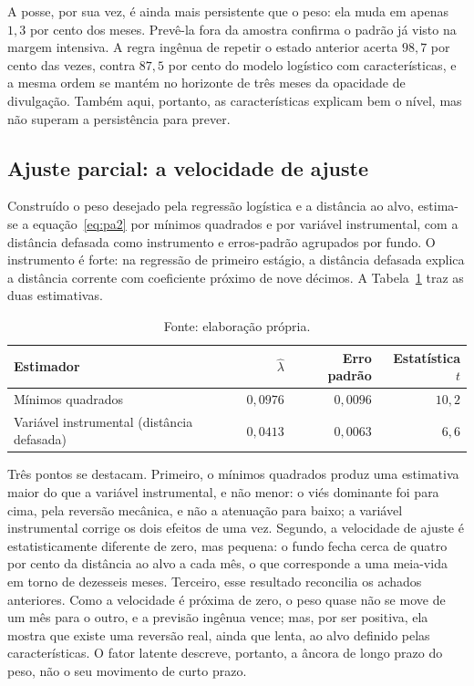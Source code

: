 \documentclass[12pt,a4paper]{article}
\begin{document}
A posse, por sua vez, é ainda mais persistente que o peso: ela muda em apenas $1{,}3$ por cento dos
meses. Prevê-la fora da amostra confirma o padrão já visto na margem intensiva. A regra ingênua de
repetir o estado anterior acerta $98{,}7$ por cento das vezes, contra $87{,}5$ por cento do modelo
logístico com características, e a mesma ordem se mantém no horizonte de três meses da opacidade de
divulgação. Também aqui, portanto, as características explicam bem o nível, mas não superam a
persistência para prever.

\subsection{Ajuste parcial: a velocidade de ajuste}

Construído o peso desejado pela regressão logística e a distância ao alvo, estima-se a
equação~\eqref{eq:pa2} por mínimos quadrados e por variável instrumental, com a distância
defasada como instrumento e erros-padrão agrupados por fundo. O instrumento é forte: na regressão
de primeiro estágio, a distância defasada explica a distância corrente com coeficiente próximo de
nove décimos. A Tabela~\ref{tab:lambda} traz as duas estimativas.

\begin{table}[h]\centering\small
\caption{Velocidade de ajuste na equação da variação do peso. Erro-padrão agrupado por fundo;
10.570 observações de fundo-mês.}
\label{tab:lambda}
\begin{tabular}{@{}lrrr@{}}
\toprule
Estimador & $\widehat{\lambda}$ & Erro padrão & Estatística $t$ \\
\midrule
Mínimos quadrados                          & $0{,}0976$ & $0{,}0096$ & $10{,}2$ \\
Variável instrumental (distância defasada) & $0{,}0413$ & $0{,}0063$ & $6{,}6$  \\
\bottomrule
\end{tabular}
\caption*{\footnotesize Fonte: elaboração própria.}
\end{table}

Três pontos se destacam. Primeiro, o mínimos quadrados produz uma estimativa maior do que a
variável instrumental, e não menor: o viés dominante foi para cima, pela reversão mecânica, e não
a atenuação para baixo; a variável instrumental corrige os dois efeitos de uma vez. Segundo, a
velocidade de ajuste é estatisticamente diferente de zero, mas pequena: o fundo fecha cerca de
quatro por cento da distância ao alvo a cada mês, o que corresponde a uma meia-vida em torno de
dezesseis meses. Terceiro, esse resultado reconcilia os achados anteriores. Como a velocidade é
próxima de zero, o peso quase não se move de um mês para o outro, e a previsão ingênua vence; mas,
por ser positiva, ela mostra que existe uma reversão real, ainda que lenta, ao alvo definido pelas
características. O fator latente descreve, portanto, a âncora de longo prazo do peso, não o seu
movimento de curto prazo.
\end{document}
